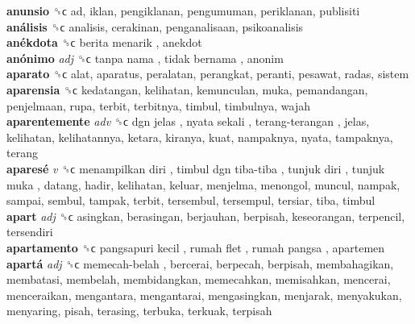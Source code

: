 \textbf{anunsio} ␝ϲ  ad, iklan, pengiklanan, pengumuman, periklanan, publisiti  \\
\textbf{análisis} ␝ϲ  analisis, cerakinan, penganalisaan, psikoanalisis  \\
\textbf{anékdota} ␝ϲ   berita menarik , anekdot  \\
\textbf{anónimo} \emph{adj}  ␝ϲ   tanpa nama ,  tidak bernama , anonim  \\
\textbf{aparato} ␝ϲ  alat, aparatus, peralatan, perangkat, peranti, pesawat, radas, sistem  \\
\textbf{aparensia} ␝ϲ  kedatangan, kelihatan, kemunculan, muka, pemandangan, penjelmaan, rupa, terbit, terbitnya, timbul, timbulnya, wajah  \\
\textbf{aparentemente} \emph{adv}  ␝ϲ   dgn jelas ,  nyata sekali ,  terang-terangan , jelas, kelihatan, kelihatannya, ketara, kiranya, kuat, nampaknya, nyata, tampaknya, terang  \\
\textbf{aparesé} \emph{v}  ␝ϲ   menampilkan diri ,  timbul dgn tiba-tiba ,  tunjuk diri ,  tunjuk muka , datang, hadir, kelihatan, keluar, menjelma, menongol, muncul, nampak, sampai, sembul, tampak, terbit, tersembul, tersempul, tersiar, tiba, timbul  \\
\textbf{apart} \emph{adj}  ␝ϲ  asingkan, berasingan, berjauhan, berpisah, keseorangan, terpencil, tersendiri  \\
\textbf{apartamento} ␝ϲ   pangsapuri kecil ,  rumah flet ,  rumah pangsa , apartemen  \\
\textbf{apartá} \emph{adj}  ␝ϲ   memecah-belah , bercerai, berpecah, berpisah, membahagikan, membatasi, membelah, membidangkan, memecahkan, memisahkan, mencerai, menceraikan, mengantara, mengantarai, mengasingkan, menjarak, menyakukan, menyaring, pisah, terasing, terbuka, terkuak, terpisah  \\

